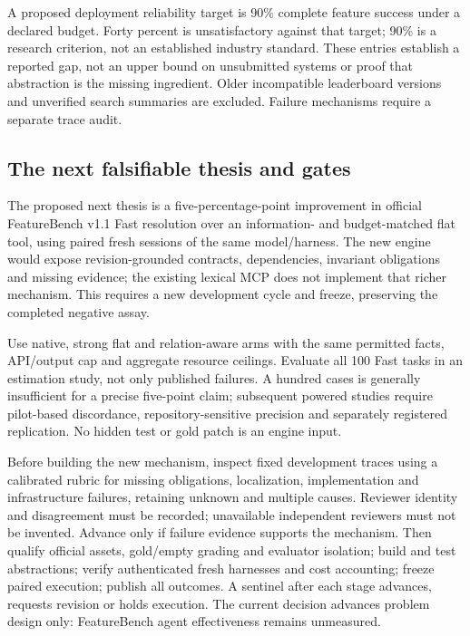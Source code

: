 \documentclass[11pt]{article}
\begin{document}
A proposed deployment reliability target is 90\% complete feature success under a declared budget. Forty percent is unsatisfactory against that target; 90\% is a research criterion, not an established industry standard. These entries establish a reported gap, not an upper bound on unsubmitted systems or proof that abstraction is the missing ingredient. Older incompatible leaderboard versions and unverified search summaries are excluded. Failure mechanisms require a separate trace audit.

\subsection{The next falsifiable thesis and gates}
The proposed next thesis is a five-percentage-point improvement in official FeatureBench v1.1 Fast resolution over an information- and budget-matched flat tool, using paired fresh sessions of the same model/harness. The new engine would expose revision-grounded contracts, dependencies, invariant obligations and missing evidence; the existing lexical MCP does not implement that richer mechanism. This requires a new development cycle and freeze, preserving the completed negative assay.

Use native, strong flat and relation-aware arms with the same permitted facts, API/output cap and aggregate resource ceilings. Evaluate all 100 Fast tasks in an estimation study, not only published failures. A hundred cases is generally insufficient for a precise five-point claim; subsequent powered studies require pilot-based discordance, repository-sensitive precision and separately registered replication. No hidden test or gold patch is an engine input.

Before building the new mechanism, inspect fixed development traces using a calibrated rubric for missing obligations, localization, implementation and infrastructure failures, retaining unknown and multiple causes. Reviewer identity and disagreement must be recorded; unavailable independent reviewers must not be invented. Advance only if failure evidence supports the mechanism. Then qualify official assets, gold/empty grading and evaluator isolation; build and test abstractions; verify authenticated fresh harnesses and cost accounting; freeze paired execution; publish all outcomes. A sentinel after each stage advances, requests revision or holds execution. The current decision advances problem design only: FeatureBench agent effectiveness remains unmeasured.

\clearpage\begingroup\small\setlength{\bibsep}{3pt}

\endgroup
\clearpage
\end{document}
